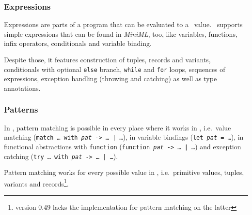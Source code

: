 \subsubsection*{Expressions}

Expressions are parts of a program that can be evaluated to a \ocaml\ value.
\easyocaml\ supports simple expressions that can be found in \textsl{MiniML},
too, like variables, functions, infix operators, conditionals and variable
binding.

Despite those, it features construction of tuples, records and variants,
conditionals with optional \texttt{else} branch, \texttt{while} and
\texttt{for} loops, sequences of expressions, exception handling (throwing and
catching) as well as type annotations.

\subsubsection*{Patterns}

In \easyocaml, pattern matching is possible in every place where it works in
\ocaml, i.e.\ value matching (\texttt{match \ldots\ with \emph{pat} -> \ldots\ |
\ldots}), in variable bindings (\texttt{let \emph{pat} = \ldots}), in
functional abstractions with \texttt{function} (\texttt{function \emph{pat} -> \ldots\ |
\ldots}) and exception catching (\texttt{try \ldots\ with \emph{pat} -> \ldots\ | \ldots}).

Pattern matching works for every possible value in \easyocaml, i.e.\ primitive values,
tuples, variants and records\footnote{version 0.49 lacks the implementation for pattern matching on the latter}.
